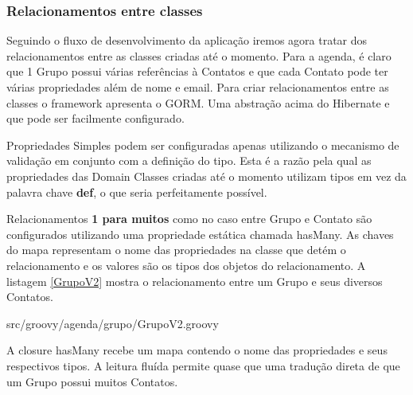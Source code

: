 \documentclass[12pt]{article}
\begin{document}
\subsubsection{Relacionamentos entre classes}
    
    Seguindo o fluxo de desenvolvimento da aplicação iremos agora tratar dos relacionamentos
    entre as classes criadas até o momento. Para a agenda, é claro que 1 Grupo
    possui várias referências à Contatos e que cada Contato pode ter várias propriedades
    além de nome e email. Para criar relacionamentos entre as classes o framework 
    apresenta o GORM. Uma abstração acima do Hibernate e que pode ser facilmente
    configurado.
    
    Propriedades Simples podem ser configuradas apenas utilizando o mecanismo de
    validação em conjunto com a definição do tipo. Esta é a razão pela qual as 
    propriedades das Domain Classes criadas até o momento utilizam tipos em vez 
    da palavra chave \textbf{def}, o que seria perfeitamente possível.
    
    Relacionamentos \textbf{1 para muitos} como no caso entre Grupo e Contato são
    configurados utilizando uma propriedade estática chamada hasMany. As chaves
    do mapa representam o nome das propriedades na classe que detém o relacionamento
    e os valores são os tipos dos objetos do relacionamento. A listagem \ref{GrupoV2}
    mostra o relacionamento entre um Grupo e seus diversos Contatos.
    
    
                    {src/groovy/agenda/grupo/GrupoV2.groovy}
    
    A closure hasMany recebe um mapa contendo o nome das propriedades e seus respectivos
    tipos. A leitura fluída permite quase que uma tradução direta de que um Grupo
    possui muitos Contatos.
    
    
    
\end{document}
